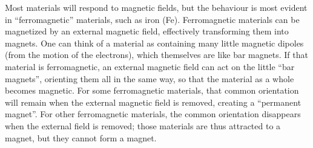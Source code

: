 Most materials will respond to magnetic fields, but the behaviour is most evident in ``ferromagnetic'' materials, such as iron (Fe). Ferromagnetic materials can be magnetized by an external magnetic field, effectively transforming them into magnets. One can think of a material as containing many little magnetic dipoles (from the motion of the electrons), which themselves are like bar magnets. If that material is ferromagnetic,  an external magnetic field can act on the little ``bar magnets'', orienting them all in the same way, so that the material as a whole becomes magnetic. For some ferromagnetic materials, that common orientation will remain when the external magnetic field is removed, creating a ``permanent magnet''. For other ferromagnetic materials, the common orientation disappears when the external field is removed; those materials are thus attracted to a magnet, but they cannot form a magnet. 
  
